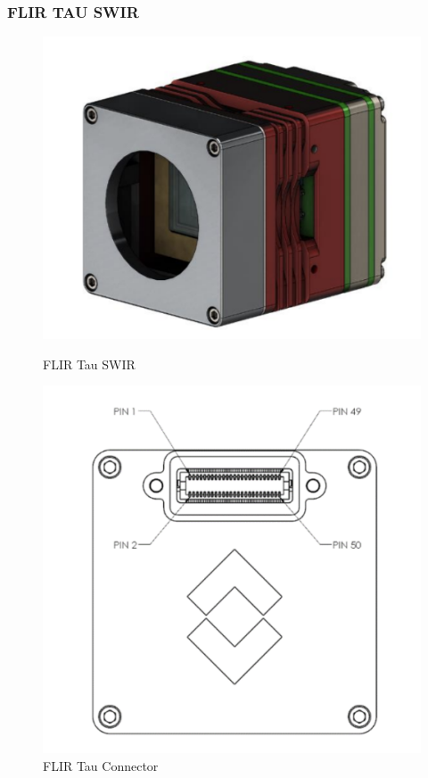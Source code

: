 \documentclass[12pt,a4paper]{article}
\begin{document}
    \subsubsection{FLIR TAU SWIR}
    \begin{figure}[H]
        \centering
            \begin{minipage}{0.49\linewidth}
            \centering
            \includegraphics[width=1\textwidth]{../figures/tau_ss.png}
            \caption{\centering FLIR Tau SWIR}
            \label{fig:left_fig}
        \end{minipage}
        \begin{minipage}{0.4\linewidth}
            \centering
            \includegraphics[width=1\textwidth]{../figures/tau_conn_ss.png}
            \caption{\centering FLIR Tau Connector}
            \label{fig:right_fig}
        \end{minipage}
    \end{figure}
\end{document}
